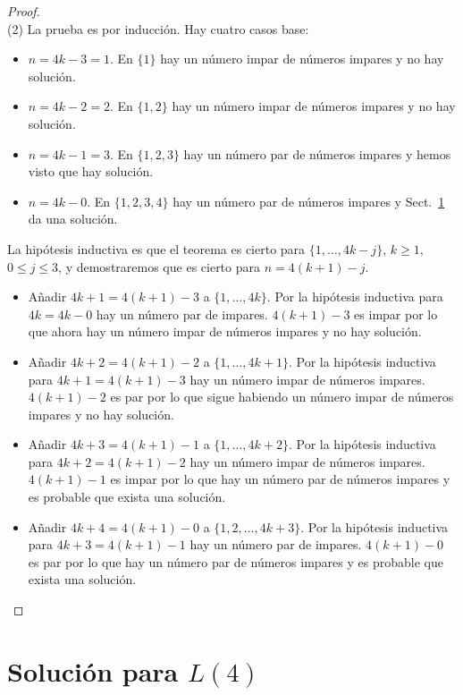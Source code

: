 \begin{proof}
\mbox{}\\
(2)
La prueba es por inducción.
Hay cuatro casos base:
\begin{itemize}
\item $n=4k-3=1$. En $\{1\}$ hay un número impar de números impares y no hay solución.
\item $n=4k-2=2$. En $\{1,2\}$ hay un número impar de números impares y no hay solución.
\item $n=4k-1=3$. En $\{1,2,3\}$ hay un número par de números impares y hemos visto que hay solución.
\item $n=4k-0$. En $\{1,2,3,4\}$ hay un número par de números impares y Sect.~\ref{s.langford-four} da una solución.
\end{itemize}

La hipótesis inductiva es que el teorema es cierto para $\{1,\ldots,4k-j\}$, $k\ge 1$, $0\leq j\leq 3$, y demostraremos que es cierto para $n=4(k+1)-j$.

\begin{itemize}
\item Añadir $4k+1=4(k+1)-3$ a $\{1,\ldots,4k\}$. Por la hipótesis inductiva para $4k=4k-0$ hay un número par de impares. $4(k+1)-3$ es impar por lo que ahora hay un número impar de números impares y no hay solución.
\item Añadir $4k+2=4(k+1)-2$ a $\{1,\ldots,4k+1\}$. Por la hipótesis inductiva para $4k+1=4(k+1)-3$ hay un número impar de números impares. $4(k+1)-2$ es par por lo que sigue habiendo un número impar de números impares y no hay solución.
\item Añadir $4k+3=4(k+1)-1$ a $\{1,\ldots,4k+2\}$. Por la hipótesis inductiva para $4k+2=4(k+1)-2$ hay un número impar de números impares. $4(k+1)-1$ es impar por lo que hay un número par de números impares y es probable que exista una solución.
\item Añadir $4k+4=4(k+1)-0$ a $\{1,2,\ldots,4k+3\}$. Por la hipótesis inductiva para $4k+3=4(k+1)-1$ hay un número par de impares. $4(k+1)-0$ es par por lo que hay un número par de números impares y es probable que exista una solución.
\end{itemize}
\end{proof}


\section{Solución para $L(4)$}\label{s.langford-four}

